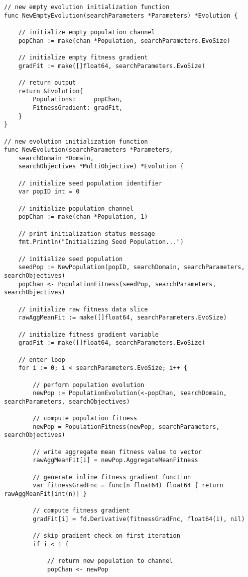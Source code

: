 \begin{lstlisting}[basicstyle=\tiny]
// new empty evolution initialization function
func NewEmptyEvolution(searchParameters *Parameters) *Evolution {

	// initialize empty population channel
	popChan := make(chan *Population, searchParameters.EvoSize)

	// initialize empty fitness gradient
	gradFit := make([]float64, searchParameters.EvoSize)

	// return output
	return &Evolution{
		Populations:     popChan,
		FitnessGradient: gradFit,
	}
}

// new evolution initialization function
func NewEvolution(searchParameters *Parameters, 
    searchDomain *Domain, 
    searchObjectives *MultiObjective) *Evolution {

	// initialize seed population identifier
	var popID int = 0

	// initialize population channel
	popChan := make(chan *Population, 1)

	// print initialization status message
	fmt.Println("Initializing Seed Population...")

	// initialize seed population
	seedPop := NewPopulation(popID, searchDomain, searchParameters, searchObjectives)
	popChan <- PopulationFitness(seedPop, searchParameters, searchObjectives)

	// initialize raw fitness data slice
	rawAggMeanFit := make([]float64, searchParameters.EvoSize)

	// initialize fitness gradient variable
	gradFit := make([]float64, searchParameters.EvoSize)

	// enter loop
	for i := 0; i < searchParameters.EvoSize; i++ {

		// perform population evolution
		newPop := PopulationEvolution(<-popChan, searchDomain, searchParameters, searchObjectives)

		// compute population fitness
		newPop = PopulationFitness(newPop, searchParameters, searchObjectives)

		// write aggregate mean fitness value to vector
		rawAggMeanFit[i] = newPop.AggregateMeanFitness

		// generate inline fitness gradient function
		var fitnessGradFnc = func(n float64) float64 { return rawAggMeanFit[int(n)] }

		// compute fitness gradient
		gradFit[i] = fd.Derivative(fitnessGradFnc, float64(i), nil)

		// skip gradient check on first iteration
		if i < 1 {

			// return new population to channel
			popChan <- newPop


\end{lstlisting}
